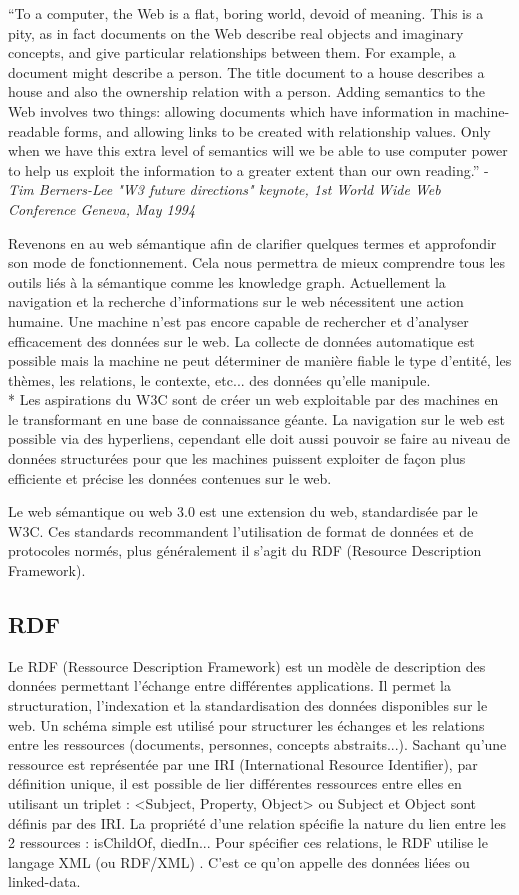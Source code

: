 \enquote{To a computer, the Web is a flat, boring world, devoid of meaning. This is a pity, as in fact documents on the Web describe real objects and imaginary concepts, and give particular relationships between them. For example, a document might describe a person. The title document to a house describes a house and also the ownership relation with a person. Adding semantics to the Web involves two things: allowing documents which have information in machine-readable forms, and allowing links to be created with relationship values. Only when we have this extra level of semantics will we be able to use computer power to help us exploit the information to a greater extent than our own reading.} - \textit{Tim Berners-Lee "W3 future directions" keynote, 1st World Wide Web Conference Geneva, May 1994} \cite{tim}

Revenons en au web sémantique afin de clarifier quelques termes et approfondir son mode de fonctionnement. Cela nous permettra de mieux comprendre tous les outils liés à la sémantique comme les knowledge graph. Actuellement la navigation et la recherche d'informations sur le web nécessitent une action humaine. Une machine n'est pas encore capable de rechercher et d'analyser efficacement des données sur le web. La collecte de données automatique est possible mais la machine ne peut déterminer de manière fiable le type d'entité, les thèmes, les relations, le contexte, etc... des données qu'elle manipule.
\\*
Les aspirations du W3C sont de créer un web exploitable par des machines en le transformant en une base de connaissance géante.
La navigation sur le web est possible via des hyperliens, cependant elle doit aussi pouvoir se faire au niveau de données structurées pour que les machines puissent exploiter de façon plus efficiente et précise les données contenues sur le web.

Le web sémantique ou web 3.0 est une extension du web, standardisée par le W3C. Ces standards recommandent l'utilisation de format de données et de protocoles normés, plus généralement il s'agit du RDF (Resource Description Framework).

\subsection{RDF}

Le RDF (Ressource Description Framework) est un modèle de description des données permettant l'échange entre différentes applications. Il permet la structuration, l'indexation et la standardisation des données disponibles sur le web. Un schéma simple est utilisé pour structurer les échanges et les relations entre les ressources (documents, personnes, concepts abstraits...). Sachant qu'une ressource est représentée par une IRI (International Resource Identifier), par définition unique, il est possible de lier différentes ressources entre elles en utilisant un triplet : <Subject, Property, Object> ou Subject et Object sont définis par des IRI. La propriété d'une relation spécifie la nature du lien entre les 2 ressources : isChildOf, diedIn... Pour spécifier ces relations, le RDF utilise le langage XML (ou RDF/XML) \cite{rdf}. C'est ce qu'on appelle des données liées ou linked-data.


